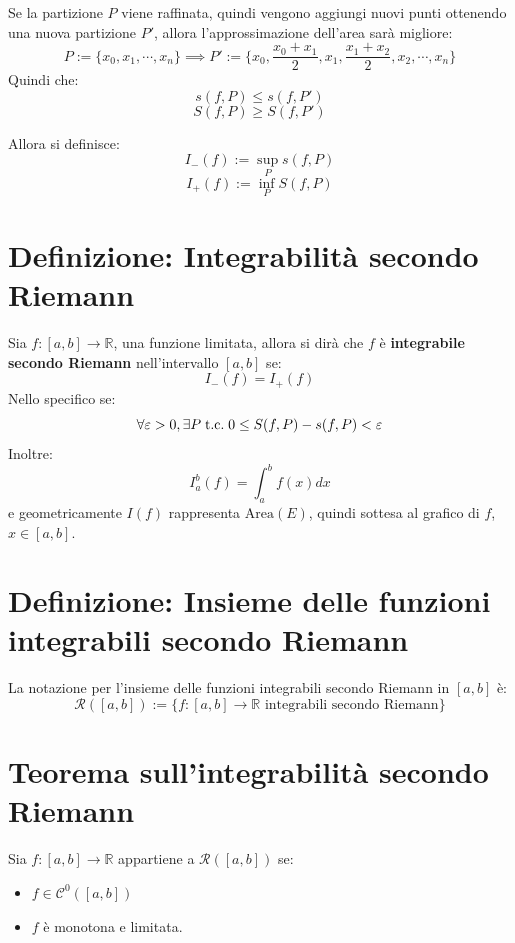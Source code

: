 \documentclass[a4paper,12pt,openright]{book}
\begin{document}
	Se la partizione $P$ viene raffinata, quindi vengono aggiungi nuovi punti ottenendo una nuova partizione $P'$, allora l'approssimazione dell'area sarà migliore:
	\[P := \{x_0, x_1, \cdots, x_n\} \implies P' := \{x_0, \frac{x_0 + x_1}{2}, x_1, \frac{x_1 + x_2}{2}, x_2, \cdots, x_n \}\]  
	Quindi che:
	\[s(f, P) \leq s(f, P')\]
	\[S(f, P) \geq S(f, P')\]
	
	Allora si definisce:
	\[I_-(f) := \sup_{P} s(f, P)\]
	\[I_+(f) := \inf_{P} S(f, P)\]
	
	\newpage
	
	\section{Definizione: Integrabilità secondo Riemann}
	Sia $f: [a, b] \longrightarrow \mathbb{R}$, una funzione limitata, allora si dirà che $f$ è \textbf{integrabile secondo Riemann} nell'intervallo $[a, b]$ se:
	\[I_-(f) = I_+(f)\]
	Nello specifico se:
	\[\forall \varepsilon > 0, \exists P \;\text{t.c.}\; 0 \leq S(f, P) - s(f, P) < \varepsilon\]
	Inoltre:
	\[I_a^b (f) = \int_{a}^{b} f(x) dx\]
	e geometricamente $I(f)$ rappresenta $\mathrm{Area}(E)$, quindi sottesa al grafico di $f$, $x \in [a, b]$.
	
	\section{Definizione: Insieme delle funzioni integrabili secondo Riemann}
	La notazione per l'insieme delle funzioni integrabili secondo Riemann in $[a, b]$ è:
	\[\mathcal{R}([a, b]) := \{f: [a, b] \longrightarrow \mathbb{R} \text{ integrabili secondo Riemann}\}\]
	
	\newpage
	
	\section{Teorema sull'integrabilità secondo Riemann}
	Sia $f: [a, b] \longrightarrow \mathbb{R}$ appartiene a $\mathcal{R}([a, b])$ se:
	\begin{itemize}
		\item $f \in \mathcal{C}^0([a, b])$
		\item $f$ è monotona e limitata.
	\end{itemize}
	
\end{document}
